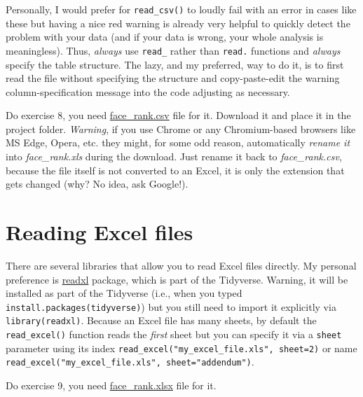 \documentclass[
]{book}
\begin{document}
Personally, I would prefer for \texttt{read\_csv()} to loudly fail with an error in cases like these but having a nice red warning is already very helpful to quickly detect the problem with your data (and if your data is wrong, your whole analysis is meaningless). Thus, \emph{always} use \texttt{read\_} rather than \texttt{read.} functions and \emph{always} specify the table structure. The lazy, and my preferred, way to do it, is to first read the file without specifying the structure and copy-paste-edit the warning column-specification message into the code adjusting as necessary.

Do exercise 8, you need \href{data/face_rank.csv}{face\_rank.csv} file for it. Download it and place it in the project folder. \emph{Warning}, if you use Chrome or any Chromium-based browsers like MS Edge, Opera, etc. they might, for some odd reason, automatically \emph{rename it} into \emph{face\_rank.xls} during the download. Just rename it back to \emph{face\_rank.csv}, because the file itself is not converted to an Excel, it is only the extension that gets changed (why? No idea, ask Google!).

\hypertarget{readxl}{%
\section{Reading Excel files}\label{readxl}}

There are several libraries that allow you to read Excel files directly. My personal preference is \href{https://readxl.tidyverse.org/}{readxl} package, which is part of the Tidyverse. Warning, it will be installed as part of the Tidyverse (i.e., when you typed \texttt{install.packages(tidyverse)}) but you still need to import it explicitly via \texttt{library(readxl)}. Because an Excel file has many sheets, by default the \texttt{read\_excel()} function reads the \emph{first} sheet but you can specify it via a \texttt{sheet} parameter using its index \texttt{read\_excel("my\_excel\_file.xls",\ sheet=2)} or name \texttt{read\_excel("my\_excel\_file.xls",\ sheet="addendum")}.

Do exercise 9, you need \href{data/face_rank.xlsx}{face\_rank.xlsx} file for it.
\end{document}
